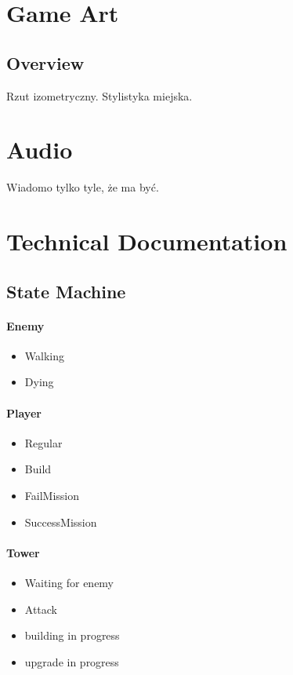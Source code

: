 \documentclass[12pt]{article}
\begin{document}
\newpage
\section{Game Art}
\subsection{Overview}
Rzut izometryczny. Stylistyka miejska.

\section{Audio}
Wiadomo tylko tyle, że ma być.

\newpage

\section{Technical Documentation}
\subsection{State Machine}
\paragraph{Enemy}
\begin{itemize}
	\item Walking
	\item Dying
\end{itemize}

\paragraph{Player}
\begin{itemize}
	\item Regular
	\item Build
	\item FailMission
	\item SuccessMission
\end{itemize}

\paragraph{Tower}
\begin{itemize}
	\item Waiting for enemy
	\item Attack
	\item building in progress
	\item upgrade in progress
\end{itemize}
\end{document}
